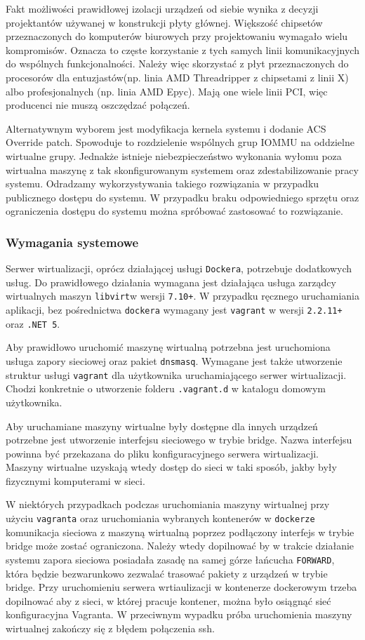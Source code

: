 \documentclass[../opis-rozwiazania.tex]{subfiles}
\begin{document}
Fakt możliwości prawidłowej izolacji urządzeń od siebie wynika z decyzji projektantów używanej w konstrukcji płyty głównej.
Większość chipsetów przeznaczonych do komputerów biurowych przy projektowaniu wymagało wielu kompromisów.
Oznacza to częste korzystanie z tych samych linii komunikacyjnych do wspólnych funkcjonalności.
Należy więc skorzystać z płyt przeznaczonych do procesorów dla entuzjastów(np. linia AMD Threadripper z chipsetami z linii X) albo profesjonalnych (np. linia AMD Epyc).
Mają one wiele linii PCI, więc producenci nie muszą oszczędzać połączeń.

Alternatywnym wyborem jest modyfikacja kernela systemu i dodanie ACS Override patch.
Spowoduje to rozdzielenie wspólnych grup IOMMU na oddzielne wirtualne grupy.
Jednakże istnieje niebezpieczeństwo wykonania wyłomu poza wirtualna maszynę z tak skonfigurowanym systemem oraz zdestabilizowanie pracy systemu.
Odradzamy wykorzystywania takiego rozwiązania w przypadku publicznego dostępu do systemu.
W przypadku braku odpowiedniego sprzętu oraz ograniczenia dostępu do systemu można spróbować zastosować to rozwiązanie.

\subsubsection{Wymagania systemowe}
Serwer wirtualizacji, oprócz działającej usługi \texttt{Dockera}, potrzebuje dodatkowych usług.
Do prawidłowego działania wymagana jest działająca usługa zarządcy wirtualnych maszyn \texttt{libvirt}w wersji \texttt{7.10+}. W przypadku ręcznego uruchamiania aplikacji, bez pośrednictwa \texttt{dockera} wymagany jest \texttt{vagrant} w wersji \texttt{2.2.11+} oraz \texttt{.NET 5}.

Aby prawidłowo uruchomić maszynę wirtualną potrzebna jest uruchomiona usługa zapory sieciowej oraz pakiet \texttt{dnsmasq}.
Wymagane jest także utworzenie struktur usługi \texttt{vagrant} dla użytkownika uruchamiającego serwer wirtualizacji.
Chodzi konkretnie o utworzenie folderu \texttt{.vagrant.d} w katalogu domowym użytkownika.

Aby uruchamiane maszyny wirtualne były dostępne dla innych urządzeń potrzebne jest utworzenie interfejsu sieciowego w trybie bridge.
Nazwa interfejsu powinna być przekazana do pliku konfiguracyjnego serwera wirtualizacji.
Maszyny wirtualne uzyskają wtedy dostęp do sieci w taki sposób, jakby były fizycznymi komputerami w sieci.

W niektórych przypadkach podczas uruchomiania maszyny wirtualnej przy użyciu \texttt{vagranta} oraz uruchomiania wybranych kontenerów w \texttt{dockerze} komunikacja sieciowa z maszyną wirtualną poprzez podłączony interfejs w trybie bridge może zostać ograniczona.
Należy wtedy dopilnować by w trakcie działanie systemu zapora sieciowa posiadała zasadę na samej górze łańcucha \texttt{FORWARD}, która będzie bezwarunkowo zezwalać trasować pakiety z urządzeń w trybie bridge.
Przy uruchomieniu serwera wrtiaulizacji w kontenerze dockerowym trzeba dopilnować aby z sieci, w której pracuje kontener, można było osiągnąć sieć konfiguracyjna Vagranta.
W przeciwnym wypadku próba uruchomienia maszyny wirtualnej zakończy się z błędem połączenia ssh.
\end{document}

